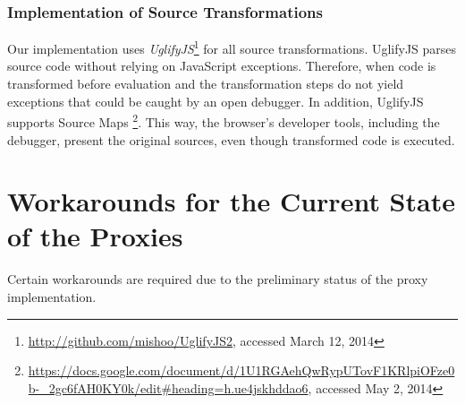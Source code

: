 












\subsubsection{Implementation of Source Transformations}

Our implementation uses \emph{UglifyJS}\footnote{\url{http://github.com/mishoo/UglifyJS2}, accessed March 12, 2014} for all source transformations.
UglifyJS parses source code without relying on JavaScript exceptions.
Therefore, when code is transformed before evaluation and the transformation steps do not yield exceptions that could be caught by an open debugger.
In addition, UglifyJS supports Source Maps \footnote{\url{https://docs.google.com/document/d/1U1RGAehQwRypUTovF1KRlpiOFze0b-_2gc6fAH0KY0k/edit\#heading=h.ue4jskhddao6}, accessed May 2, 2014}.
This way, the browser's developer tools, including the debugger, present the original sources, even though transformed code is executed.










\section{Workarounds for the Current State of the Proxies} \label{sec:IMPLEMENTATION:4}


Certain workarounds are required due to the preliminary status of the proxy implementation.

